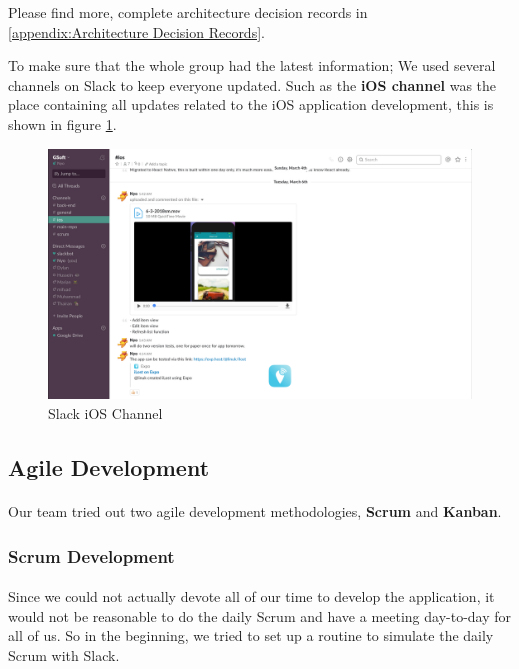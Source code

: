 \documentclass[12pt,a4paper]{article}
\begin{document}
        Please find more, complete architecture decision records in \ref{appendix:Architecture Decision Records}.
        
        To make sure that the whole group had the latest information; We used several channels on Slack to keep everyone updated. Such as the {\bf iOS channel} was the place containing all updates related to the iOS application development, this is shown in figure \ref{fig:Slack iOS Channel}. 
        
        \begin{figure}[H]
          \centering
          \includegraphics[width=1\textwidth]{../assets/development-records-slack-ios-channel.png}
          \caption{Slack iOS Channel}
          \label{fig:Slack iOS Channel}
        \end{figure}

      \subsection{Agile Development} 
        
        \paragraph{}Our team tried out two agile development methodologies, {\bf Scrum} and {\bf Kanban}.

        \subsubsection{Scrum Development}
          \paragraph{}Since we could not actually devote all of our time to develop the application, it would not be reasonable to do the daily Scrum and have a meeting day-to-day for all of us. So in the beginning, we tried to set up a routine to simulate the daily Scrum with Slack.
\end{document}
